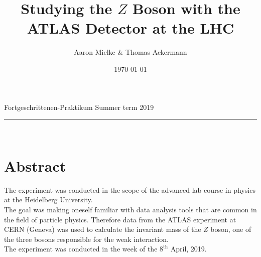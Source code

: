 \documentclass[12pt, a4paper, bibliography=totoc]{scrartcl}
\title{Studying the $Z$ Boson with the ATLAS Detector at the LHC}
\author{Aaron Mielke \& Thomas Ackermann}
\date{\today}
\begin{document}
\begin{center}
	\makeatletter
	\thispagestyle{empty}
	\large{Fortgeschrittenen-Praktikum}
\hfill
	 \vspace{-5mm}
    \large{Summer term 2019} 
    \rule{\textwidth}{0.2pt}
    \Huge\textbf{\@title} \\
	\large{\@author}
	\makeatother
\end{center}
\section*{Abstract}
The experiment was conducted in the scope of the advanced lab course in physics at the Heidelberg University. \\
The goal was making oneself familiar with data analysis tools that are common in the field of particle physics.
Therefore data from the ATLAS experiment at CERN (Geneva) was used to calculate the invariant mass of the $Z$ boson, one of the three bosons responsible for the weak interaction. \\
The experiment was conducted in the week of the $8^\text{th}$ April, 2019.
\end{document}
